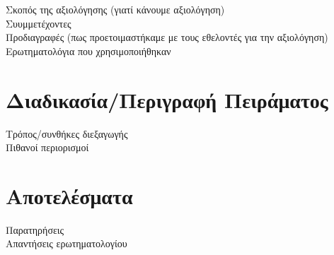 
Σκοπός της αξιολόγησης (γιατί κάνουμε αξιολόγηση)\\
Συυμμετέχοντες\\
Προδιαγραφές (πως προετοιμαστήκαμε με τους εθελοντές για την αξιολόγηση)\\
Ερωτηματολόγια που χρησιμοποιήθηκαν


\section{Διαδικασία/Περιγραφή Πειράματος}
Τρόπος/συνθήκες διεξαγωγής\\
Πιθανοί περιορισμοί

\section{Αποτελέσματα}
Παρατηρήσεις\\
Απαντήσεις ερωτηματολογίου



